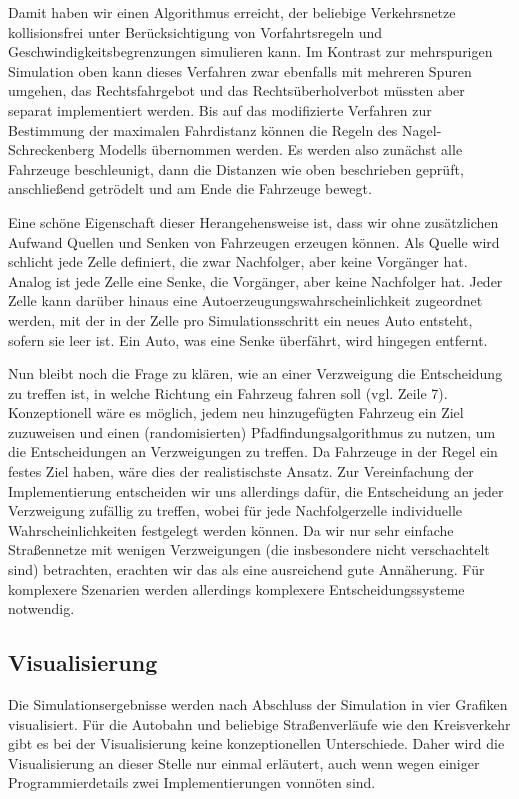 \documentclass[10pt, a4paper]{article}
\begin{document}


Damit haben wir einen Algorithmus erreicht, der beliebige Verkehrsnetze kollisionsfrei unter Berück\-sichtigung von Vorfahrtsregeln und Geschwindigkeitsbegrenzungen simulieren kann. Im Kontrast zur mehrspurigen Simulation oben kann dieses Verfahren zwar ebenfalls mit mehreren Spuren umgehen, das Rechtsfahrgebot und das Rechtsüberholverbot müssten aber separat implementiert werden. Bis auf das modifizierte Verfahren zur Bestimmung der maximalen Fahrdistanz können die Regeln des Nagel-Schreckenberg Modells \cite{nagel-schreckenberg} übernommen werden. Es werden also zunächst alle Fahrzeuge beschleunigt, dann die Distanzen wie oben beschrieben geprüft, anschließend getrödelt und am Ende die Fahrzeuge bewegt.

Eine schöne Eigenschaft dieser Herangehensweise ist, dass wir ohne zusätzlichen Aufwand Quellen und Senken von Fahrzeugen erzeugen können. Als Quelle wird schlicht jede Zelle definiert, die zwar Nachfolger, aber keine Vorgänger hat. Analog ist jede Zelle eine Senke, die Vorgänger, aber keine Nachfolger hat. Jeder Zelle kann darüber hinaus eine Autoerzeugungswahrscheinlichkeit zugeordnet werden, mit der in der Zelle pro Simulationsschritt ein neues Auto entsteht, sofern sie leer ist. Ein Auto, was eine Senke überfährt, wird hingegen entfernt.

Nun bleibt noch die Frage zu klären, wie an einer Verzweigung die Entscheidung zu treffen ist, in welche Richtung ein Fahrzeug fahren soll (vgl. Zeile 7). Konzeptionell wäre es möglich, jedem neu hinzugefügten Fahrzeug ein Ziel zuzuweisen und einen (randomisierten) Pfadfindungsalgorithmus zu nutzen, um die Entscheidungen an Verzweigungen zu treffen. Da Fahrzeuge in der Regel ein festes Ziel haben, wäre dies der realistischste Ansatz. Zur Vereinfachung der Implementierung entscheiden wir uns allerdings dafür, die Entscheidung an jeder Verzweigung zufällig zu treffen, wobei für jede Nachfolgerzelle individuelle Wahrscheinlichkeiten festgelegt werden können. Da wir nur sehr einfache Straßennetze mit wenigen Verzweigungen (die insbesondere nicht verschachtelt sind) betrachten, erachten wir das als eine ausreichend gute Annäherung. Für komplexere Szenarien werden allerdings komplexere Entscheidungssysteme notwendig.

\subsection{Visualisierung}
\label{subsec:visualisierung}
Die Simulationsergebnisse werden nach Abschluss der Simulation in vier Grafiken visualisiert. Für die Autobahn und beliebige Straßenverläufe wie den Kreisverkehr gibt es bei der Visualisierung keine konzeptionellen Unterschiede. Daher wird die Visualisierung an dieser Stelle nur einmal erläutert, auch wenn wegen einiger Programmierdetails zwei Implementierungen vonnöten sind.\\
\end{document}
